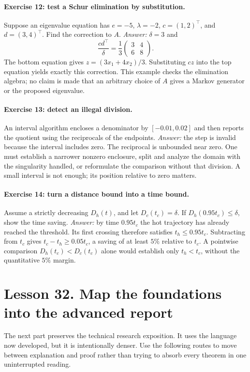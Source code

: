 \paragraph{Exercise 12: test a Schur elimination by substitution.}
Suppose an eigenvalue equation has $e=-5$, $\lambda=-2$,
$c=(1,2)^\top$, and $d=(3,4)^\top$. Find the correction to $A$.
\emph{Answer:} $\delta=3$ and
\[
\frac{cd^\top}{\delta}
=\frac13\begin{pmatrix}3&4\\6&8\end{pmatrix}.
\]
The bottom equation gives $z=(3x_1+4x_2)/3$.
Substituting $cz$ into the top equation yields exactly this correction.
This example checks the elimination algebra; no claim is made that an
arbitrary choice of $A$ gives a Markov generator or the proposed eigenvalue.

\paragraph{Exercise 13: detect an illegal division.}
An interval algorithm encloses a denominator by $[-0.01,0.02]$ and then
reports the quotient using the reciprocals of the endpoints.
\emph{Answer:} the step is invalid because the interval includes zero.
The reciprocal is unbounded near zero. One must establish a narrower
nonzero enclosure, split and analyze the domain with the singularity
handled, or reformulate the comparison without that division. A small
interval is not enough; its position relative to zero matters.

\paragraph{Exercise 14: turn a distance bound into a time bound.}
Assume a strictly decreasing $D_h(t)$, and let $D_c(t_c)=\delta$.
If $D_h(0.95t_c)\leq\delta$, show the time saving.
\emph{Answer:} by time $0.95t_c$ the hot trajectory has already reached
the threshold. Its first crossing therefore satisfies
$t_h\leq0.95t_c$. Subtracting from $t_c$ gives
$t_c-t_h\geq0.05t_c$, a saving of at least $5\%$ relative to $t_c$.
A pointwise comparison $D_h(t_c)<D_c(t_c)$ alone would establish only
$t_h<t_c$, without the quantitative $5\%$ margin.

\clearpage
\section*{Lesson 32. Map the foundations into the advanced report}
The next part preserves the technical research exposition. It uses the
language now developed, but it is intentionally denser. Use the following
routes to move between explanation and proof rather than trying to absorb
every theorem in one uninterrupted reading.

